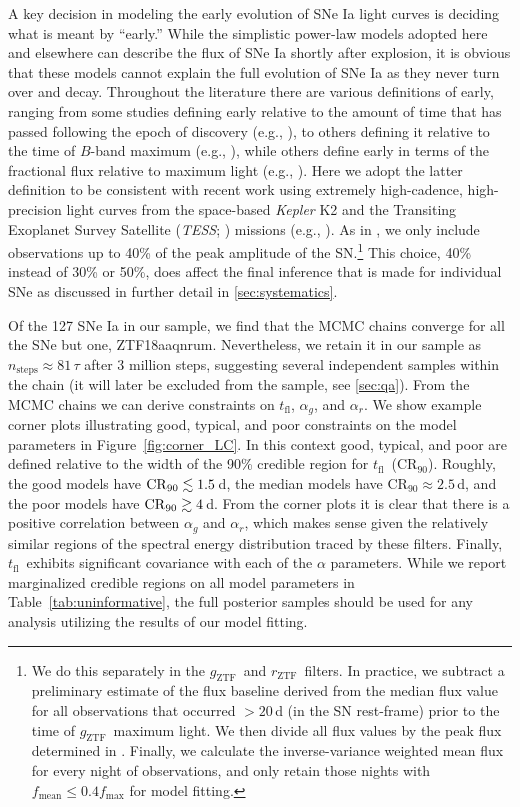 \documentclass[twocolumn]{./aastex63}
\newcommand{\rztf}{$r_\mathrm{ZTF}$}
\newcommand{\gztf}{$g_\mathrm{ZTF}$}
\newcommand{\tfl}{$t_\mathrm{fl}$}
\begin{document}
A key decision in modeling the early evolution of SNe Ia light curves is
deciding what is meant by ``early.'' While the simplistic power-law models
adopted here and elsewhere can describe the flux of SNe Ia shortly after
explosion, it is obvious that these models cannot explain the full evolution
of SNe Ia as they never turn over and decay. Throughout the literature there
are various definitions of early, ranging from some studies defining early
relative to the amount of time that has passed following the epoch of
discovery (e.g., \citealt{Zheng13,Miller18}), to others defining it relative
to the time of $B$-band maximum (e.g., \citealt{Riess99a,Conley06,Dimitriadis19}), while
others define early in terms of the fractional flux relative to maximum light
(e.g., \citealt{Olling15,Firth15,Fausnaugh19}). Here we adopt the latter
definition to be consistent with recent work using extremely high-cadence,
high-precision light curves from the space-based \textit{Kepler} K2
\citep{Howell14} and the Transiting Exoplanet Survey Satellite (\textit{TESS};
\citealt{Ricker15}) missions (e.g., \citealt{Olling15,Fausnaugh19}). As in
\citet{Olling15}, we only include observations up to 40\% of the peak
amplitude of the SN.\footnote{We do this separately in the \gztf\ and \rztf\
filters. In practice, we subtract a preliminary estimate of the flux baseline
derived from the median flux value for all observations that occurred $>20$\,d
(in the SN rest-frame) prior to the time of \gztf\ maximum light. We then
divide all flux values by the peak flux determined in \citet{Yao19}. Finally,
we calculate the inverse-variance weighted mean flux for every night of
observations, and only retain those nights with $f_\mathrm{mean} \le 0.4
f_\mathrm{max}$ for model fitting.} This choice, 40\% instead of 30\% or
50\%, does affect the final inference that is made for individual SNe as
discussed in further detail in \ref{sec:systematics}.

Of the 127 SNe Ia in our sample, we find that the MCMC chains converge for all
the SNe but one, ZTF18aaqnrum. Nevertheless, we retain it in our sample as
$n_\mathrm{steps} \approx 81 \,\tau$ after 3 million steps, suggesting several
independent samples within the chain (it will later be excluded from the sample,
see \ref{sec:qa}). From the MCMC chains we can derive constraints on \tfl,
$\alpha_g$, and $\alpha_r$. We show example corner plots illustrating good,
typical, and poor constraints on the model parameters in
Figure~\ref{fig:corner_LC}. In this context good, typical, and poor are defined
relative to the width of the 90\% credible region for \tfl\
($\mathrm{CR}_{90}$). Roughly, the good models have $\mathrm{CR}_{90} \lesssim
1.5$\,d, the median models have $\mathrm{CR}_{90} \approx 2.5$\,d, and the poor
models have $\mathrm{CR}_{90} \gtrsim 4$\,d. From the corner plots it is clear that
there is a positive correlation between $\alpha_g$ and $\alpha_r$, which makes
sense given the relatively similar regions of the spectral energy distribution
traced by these filters. Finally, \tfl\ exhibits significant covariance with
each of the $\alpha$ parameters. While we report marginalized credible regions
on all model parameters in Table~\ref{tab:uninformative}, the full posterior
samples should be used for any analysis utilizing the results of our model
fitting.
\end{document}

